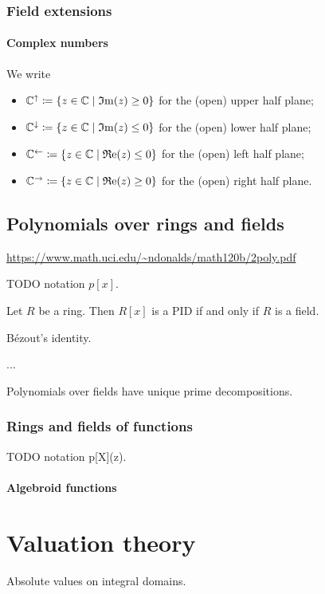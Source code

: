 \subsection{Field extensions}
\subsubsection{Complex numbers}
\begin{definition}
We write
\begin{itemize}
\item $\mathbb{C}^{\uparrow} \coloneqq \left\{ z\in\mathbb{C} \;\middle|\; \operatorname{\mathfrak{I}m}(z) \geq 0 \right\}$ for the (open) upper half plane;
\item $\mathbb{C}^{\downarrow} \coloneqq \left\{ z\in\mathbb{C} \;\middle|\; \operatorname{\mathfrak{I}m}(z) \leq 0 \right\}$ for the (open) lower half plane;
\item $\mathbb{C}^{\leftarrow} \coloneqq \left\{ z\in\mathbb{C} \;\middle|\; \operatorname{\mathfrak{R}e}(z) \leq 0 \right\}$ for the (open) left half plane;
\item $\mathbb{C}^{\rightarrow}  \coloneqq \left\{ z\in\mathbb{C} \;\middle|\; \operatorname{\mathfrak{R}e}(z) \geq 0 \right\}$ for the (open) right half plane.
\end{itemize}
\end{definition}

\section{Polynomials over rings and fields}
\url{https://www.math.uci.edu/~ndonalds/math120b/2poly.pdf}

TODO notation $p[x]$.

\begin{proposition}
Let $R$ be a ring. Then $R[x]$ is a PID \textup{if and only if} $R$ is a field.
\end{proposition}
\begin{corollary}
Bézout's identity.

...
\end{corollary}


\begin{proposition}
Polynomials over fields have unique prime decompositions.
\end{proposition}

\subsection{Rings and fields of functions}
TODO notation p[X](z).

\subsubsection{Algebroid functions}

\chapter{Valuation theory}
Absolute values on integral domains.